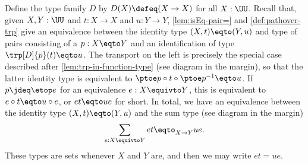 Define the type family $D$ by $D(X) \defeq (X\to X)$ for all $X:\UU$.
Recall that, given $X,Y:\UU$ and $t:X\to X$ and $u:Y\to Y$,
\cref{lem:isEq-pair=} and \cref{def:pathover-trp} give
an equivalence between the identity type $(X,t)\eqto (Y,u)$ and
type of pairs consisting of a $p:X\eqto Y$ and an identification
of type $\trp[D]{p}(t)\eqto u$. The transport on the left is precisely
the special case described after \cref{lem:trp-in-function-type}
(see diagram in the margin),
so that the latter identity type
is equivalent to $\ptoe p\circ t\circ \ptoe p^{-1} \eqto u$.
If $p\jdeq\etop e$ for an equivalence $e:X\equivto Y$,
this is equivalent to $e\circ t \eqto u\circ e$, or $e t \eqto u e$ for short.
In total, we have an equivalence between the identity type
$(X,t)\eqto(Y,u)$ and the sum type (see diagram in the margin)%
\[
  \sum_{e: X\equivto Y} et \eqto_{X\to Y} ue.
\]
These types are sets whenever $X$ and $Y$ are, and then we
may write $et = ue$.
